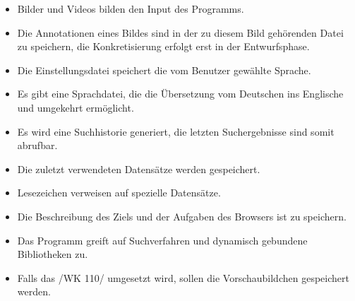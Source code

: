 \begin{itemize}
	\item Bilder und Videos bilden den Input des Programms.
	\item Die Annotationen eines Bildes sind in der zu diesem Bild gehörenden Datei zu speichern, die Konkretisierung erfolgt erst 		in der Entwurfsphase.
	\item Die Einstellungsdatei speichert die vom Benutzer gewählte Sprache.
	\item Es gibt eine Sprachdatei, die die Übersetzung vom Deutschen ins Englische und umgekehrt ermöglicht.
	\item Es wird eine Suchhistorie generiert, die letzten Suchergebnisse sind somit abrufbar. 
	\item Die zuletzt verwendeten Datensätze werden gespeichert.
	\item Lesezeichen verweisen auf spezielle Datensätze.
	\item Die Beschreibung des Ziels und der Aufgaben des Browsers ist zu speichern.
	\item Das Programm greift auf Suchverfahren und dynamisch gebundene Bibliotheken zu.
	\item Falls das /WK 110/ umgesetzt wird, sollen die Vorschaubildchen gespeichert werden.
\end{itemize}
\pagebreak